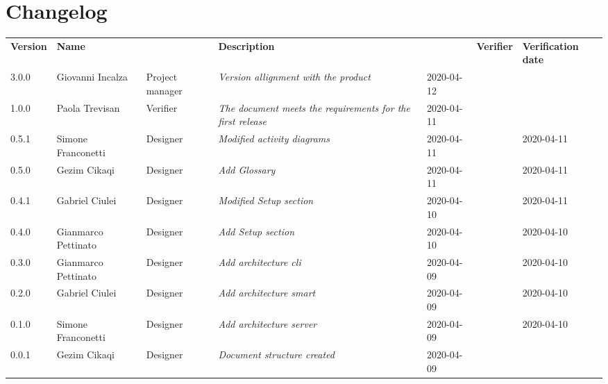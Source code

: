 \section*{Changelog}
\renewcommand{\arraystretch}{1.8}
  \setlength\LTleft{-1.7cm}
  \begin{longtable}{|p{1.7cm}|p{2cm}|p{2.5cm}|p{3cm}|p{1.7cm}|p{2cm}|p{2.3cm}|}
    \hline
    \rowcolor{header}
    \textbf{Version} & \textbf{Name} & \centering{\textbf{Role}} & \textbf{Description} &      \centering{\textbf{Date}} & \textbf{Verifier} & \textbf{Verification date} \\
    
    3.0.0 & Giovanni Incalza & Project manager & \small{\textit{Version allignment with the product}} & 2020-04-12 &  & \\
    
    1.0.0 & Paola Trevisan & Verifier & \small{\textit{The document meets the requirements for the first release}} & 2020-04-11 &  & \\
    0.5.1 & Simone Franconetti & Designer & \small{\textit{Modified activity diagrams}} & 2020-04-11 &  & 2020-04-11\\
    0.5.0 & Gezim Cikaqi & Designer & \small{\textit{Add Glossary}} & 2020-04-11 &  & 2020-04-11\\
    0.4.1 & Gabriel Ciulei & Designer & \small{\textit{Modified Setup section}} & 2020-04-10 &  & 2020-04-11\\
    0.4.0 & Gianmarco Pettinato & Designer & \small{\textit{Add Setup section}} & 2020-04-10 &  & 2020-04-10\\
    0.3.0 & Gianmarco Pettinato & Designer & \small{\textit{Add architecture cli}} & 2020-04-09 &  & 2020-04-10\\
    0.2.0 & Gabriel Ciulei & Designer & \small{\textit{Add architecture smart}} & 2020-04-09 &  & 2020-04-10\\
    0.1.0 & Simone Franconetti & Designer & \small{\textit{Add architecture server}} & 2020-04-09 &  & 2020-04-10\\
    0.0.1 & Gezim Cikaqi & Designer & \small{\textit{Document structure created}} & 2020-04-09 &  & \\

    \hline
  \end{longtable}
\setlength\LTleft{0cm}
\restoregeometry
